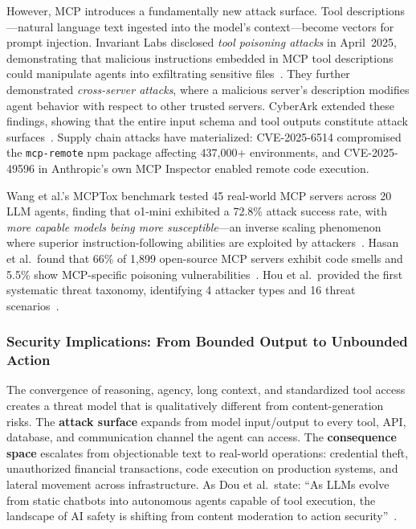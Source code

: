 However, MCP introduces a fundamentally new attack surface. Tool descriptions---natural language text ingested into the model's context---become vectors for prompt injection. Invariant Labs disclosed \emph{tool poisoning attacks} in April~2025, demonstrating that malicious instructions embedded in MCP tool descriptions could manipulate agents into exfiltrating sensitive files~\cite{invariant2025toolpoisoning}. They further demonstrated \emph{cross-server attacks}, where a malicious server's description modifies agent behavior with respect to other trusted servers. CyberArk extended these findings, showing that the entire input schema and tool outputs constitute attack surfaces~\cite{cyberark2025atpa}. Supply chain attacks have materialized: CVE-2025-6514 compromised the \texttt{mcp-remote} npm package affecting 437,000+ environments, and CVE-2025-49596 in Anthropic's own MCP Inspector enabled remote code execution.

Wang et al.'s MCPTox benchmark tested 45 real-world MCP servers across 20 LLM agents, finding that o1-mini exhibited a 72.8\% attack success rate, with \emph{more capable models being more susceptible}---an inverse scaling phenomenon where superior instruction-following abilities are exploited by attackers~\cite{wang2025mcptox}. Hasan et al.\ found that 66\% of 1,899 open-source MCP servers exhibit code smells and 5.5\% show MCP-specific poisoning vulnerabilities~\cite{hasan2025mcpglance}. Hou et al.\ provided the first systematic threat taxonomy, identifying 4 attacker types and 16 threat scenarios~\cite{hou2025mcplandscape}.


\subsubsection{Security Implications: From Bounded Output to Unbounded Action}
\label{sec:cap-implications}

The convergence of reasoning, agency, long context, and standardized tool access creates a threat model that is qualitatively different from content-generation risks. The \textbf{attack surface} expands from model input/output to every tool, API, database, and communication channel the agent can access. The \textbf{consequence space} escalates from objectionable text to real-world operations: credential theft, unauthorized financial transactions, code execution on production systems, and lateral movement across infrastructure. As Dou et al.\ state: ``As LLMs evolve from static chatbots into autonomous agents capable of tool execution, the landscape of AI safety is shifting from content moderation to action security''~\cite{dou2026ajar}.

